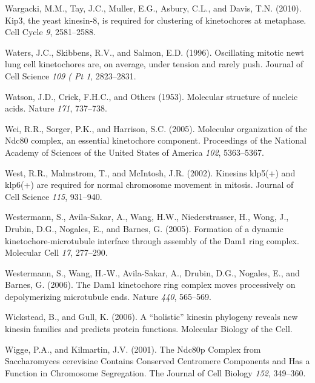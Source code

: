 \documentclass[12pt,a4paper,twoside,openright]{book}
\begin{document}
Wargacki, M.M., Tay, J.C., Muller, E.G., Asbury, C.L., and Davis, T.N.
(2010). Kip3, the yeast kinesin-8, is required for clustering of
kinetochores at metaphase. Cell Cycle \emph{9}, 2581--2588.

Waters, J.C., Skibbens, R.V., and Salmon, E.D. (1996). Oscillating
mitotic newt lung cell kinetochores are, on average, under tension and
rarely push. Journal of Cell Science \emph{109 ( Pt 1}, 2823--2831.

Watson, J.D., Crick, F.H.C., and Others (1953). Molecular structure of
nucleic acids. Nature \emph{171}, 737--738.

Wei, R.R., Sorger, P.K., and Harrison, S.C. (2005). Molecular
organization of the Ndc80 complex, an essential kinetochore component.
Proceedings of the National Academy of Sciences of the United States of
America \emph{102}, 5363--5367.

West, R.R., Malmstrom, T., and McIntosh, J.R. (2002). Kinesins klp5(+)
and klp6(+) are required for normal chromosome movement in mitosis.
Journal of Cell Science \emph{115}, 931--940.

Westermann, S., Avila-Sakar, A., Wang, H.W., Niederstrasser, H., Wong,
J., Drubin, D.G., Nogales, E., and Barnes, G. (2005). Formation of a
dynamic kinetochore-microtubule interface through assembly of the Dam1
ring complex. Molecular Cell \emph{17}, 277--290.

Westermann, S., Wang, H.-W., Avila-Sakar, A., Drubin, D.G., Nogales, E.,
and Barnes, G. (2006). The Dam1 kinetochore ring complex moves
processively on depolymerizing microtubule ends. Nature \emph{440},
565--569.

Wickstead, B., and Gull, K. (2006). A ``holistic'' kinesin phylogeny
reveals new kinesin families and predicts protein functions. Molecular
Biology of the Cell.

Wigge, P.A., and Kilmartin, J.V. (2001). The Ndc80p Complex from
Saccharomyces cerevisiae Contains Conserved Centromere Components and
Has a Function in Chromosome Segregation. The Journal of Cell Biology
\emph{152}, 349--360.
\end{document}

